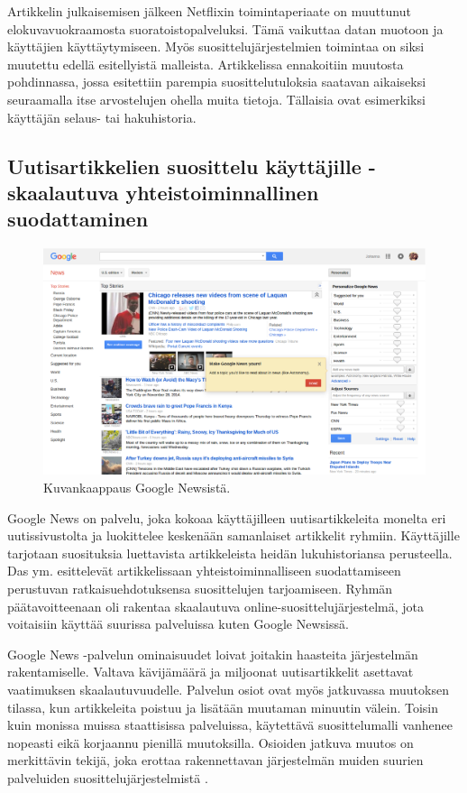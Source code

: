 \documentclass[12pt,finnish]{tktltiki2}
\theoremstyle{definition}
\theoremstyle{remark}
\begin{document}
Artikkelin julkaisemisen jälkeen Netflixin toimintaperiaate on muuttunut elokuvavuokraamosta suoratoistopalveluksi. Tämä vaikuttaa datan muotoon ja käyttäjien käyttäytymiseen. Myös suosittelujärjestelmien toimintaa on siksi muutettu edellä esitellyistä malleista. Artikkelissa ennakoitiin muutosta pohdinnassa, jossa esitettiin parempia suosittelutuloksia saatavan aikaiseksi seuraamalla itse arvostelujen ohella muita tietoja. Tällaisia ovat esimerkiksi käyttäjän selaus- tai hakuhistoria.~\cite{Bell:2007:LNP:1345448.1345465}

\subsection{Uutisartikkelien suosittelu käyttäjille - skaalautuva yhteistoiminnallinen suodattaminen}

\begin{figure}[]
\includegraphics[width = 390pt]{googlenews.eps}\caption{Kuvankaappaus Google Newsistä.}
\label{googlenews}
\end{figure} 

Google News on palvelu, joka kokoaa käyttäjilleen uutisartikkeleita monelta eri uutissivustolta ja luokittelee keskenään samanlaiset artikkelit ryhmiin. Käyttäjille tarjotaan suosituksia luettavista artikkeleista heidän lukuhistoriansa perusteella. Das ym. \cite{Das:2007:GNP:1242572.1242610} esittelevät artikkelissaan yhteistoiminnalliseen suodattamiseen perustuvan ratkaisuehdotuksensa suosittelujen tarjoamiseen. Ryhmän päätavoitteenaan oli rakentaa skaalautuva online-suosittelujärjestelmä, jota voitaisiin käyttää suurissa palveluissa kuten Google Newsissä.

Google News -palvelun ominaisuudet loivat joitakin haasteita järjestelmän rakentamiselle. Valtava kävijämäärä ja miljoonat uutisartikkelit asettavat vaatimuksen skaalautuvuudelle. Palvelun osiot ovat myös jatkuvassa muutoksen tilassa, kun artikkeleita poistuu ja lisätään muutaman minuutin välein. Toisin kuin monissa muissa staattisissa palveluissa, käytettävä suosittelumalli vanhenee nopeasti eikä korjaannu pienillä muutoksilla. Osioiden jatkuva muutos on merkittävin tekijä, joka erottaa rakennettavan järjestelmän muiden suurien palveluiden suosittelujärjestelmistä \cite{Das:2007:GNP:1242572.1242610}.
\end{document}
